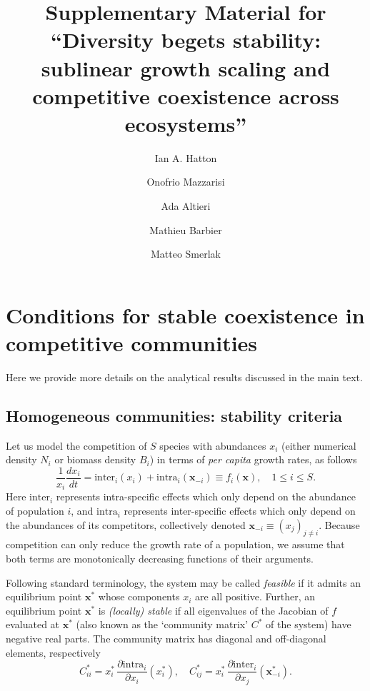 \documentclass[12pt]{article}
\title{Supplementary Material for\\ ``Diversity begets stability: sublinear growth scaling and competitive coexistence across ecosystems''}
\author{Ian A. Hatton \and Onofrio Mazzarisi \and Ada Altieri \and Mathieu Barbier \and Matteo Smerlak}
\newcommand{\inter}{\textrm{inter}}
\newcommand{\intra}{\textrm{intra}}
\begin{document}
\appendix

\maketitle




\section{Conditions for stable coexistence in competitive communities}

Here we provide more details on the analytical results discussed in the main text. 

\subsection{Homogeneous communities: stability criteria}\label{homogeneous-stability}


Let us model the competition of $S$ species with abundances $x_i$ (either numerical density $N_i$ or biomass density $B_i$) in terms of \emph{per capita} growth rates, as follows
\begin{equation}\label{model}
\frac{1}{x_i}\frac{dx_i}{dt} = \inter_i(x_i) + \intra_i(\mathbf x_{-i})\equiv f_i(\mathbf x), \quad 1\leq i\leq S .
\end{equation}
Here $\inter_i$ represents intra-specific effects which only depend on the abundance of population $i$, and  $\intra_i$ represents inter-specific effects which only depend on the abundances of its competitors, collectively denoted $\mathbf x_{-i}\equiv (x_j)_{j \neq i}$. Because competition can only reduce the growth rate of a population, we assume that both terms are monotonically decreasing functions of their arguments. 

Following standard terminology, the system may be called \emph{feasible} if it admits an equilibrium point $\mathbf x^*$ whose components $x_i$ are all positive. Further, an equilibrium point $\mathbf x^*$ is \emph{(locally) stable} if all eigenvalues of the Jacobian of $f$ evaluated at $\mathbf x^*$ (also known as the `community matrix' $C^*$ of the system) have negative real parts. 
The community matrix has diagonal and off-diagonal elements, respectively 
\begin{equation}\label{community-matrix}
    C^*_{ii} = x_i^*\, \frac{\partial \intra_i}{\partial x_i}(x_i^*), \quad C^*_{ij} = x_i^*\, \frac{\partial \inter_i}{\partial x_j}(\mathbf x_{-i}^*).
\end{equation}
\end{document}
